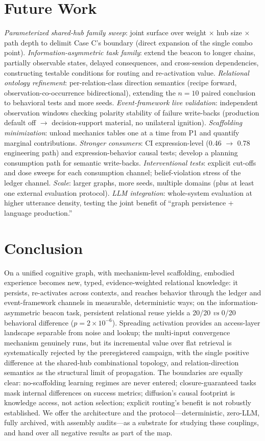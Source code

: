 \documentclass[10pt,a4paper]{article}
\begin{document}
\section{Future Work}
\label{sec:future}
\emph{Parameterized shared-hub family sweep}: joint surface over weight $\times$ hub size $\times$ path depth to delimit Case C's boundary (direct expansion of the single combo point). \emph{Information-asymmetric task family}: extend the beacon to longer chains, partially observable states, delayed consequences, and cross-session dependencies, constructing testable conditions for routing and re-activation value. \emph{Relational ontology refinement}: per-relation-class direction semantics (recipe forward, observation-co-occurrence bidirectional), extending the $n{=}10$ paired conclusion to behavioral tests and more seeds. \emph{Event-framework live validation}: independent observation windows checking polarity stability of failure write-backs (production default off $\rightarrow$ decision-support material, no unilateral ignition). \emph{Scaffolding minimization}: unload mechanics tables one at a time from P1 and quantify marginal contributions. \emph{Stronger consumers}: CI expression-level (0.46 $\rightarrow$ 0.78 engineering path) and expression-behavior causal tests; develop a planning consumption path for semantic write-backs. \emph{Interventional tests}: explicit cut-offs and dose sweeps for each consumption channel; belief-violation stress of the ledger channel. \emph{Scale}: larger graphs, more seeds, multiple domains (plus at least one external evaluation protocol). \emph{LLM integration}: whole-system evaluation at higher utterance density, testing the joint benefit of ``graph persistence + language production.''

\section{Conclusion}
On a unified cognitive graph, with mechanism-level scaffolding, embodied experience becomes new, typed, evidence-weighted relational knowledge: it persists, re-activates across contexts, and reaches behavior through the ledger and event-framework channels in measurable, deterministic ways; on the information-asymmetric beacon task, persistent relational reuse yields a 20/20 \emph{vs} 0/20 behavioral difference ($p{=}2\times10^{-6}$). Spreading activation provides an access-layer landscape separable from noise and lookup; the multi-input convergence mechanism genuinely runs, but its incremental value over flat retrieval is systematically rejected by the preregistered campaign, with the single positive difference at the shared-hub combinational topology, and relation-direction semantics as the structural limit of propagation. The boundaries are equally clear: no-scaffolding learning regimes are never entered; closure-guaranteed tasks mask internal differences on success metrics; diffusion's causal footprint is knowledge access, not action selection; explicit routing's benefit is not robustly established. We offer the architecture and the protocol---deterministic, zero-LLM, fully archived, with assembly audits---as a substrate for studying these couplings, and hand over all negative results as part of the map.
\end{document}
